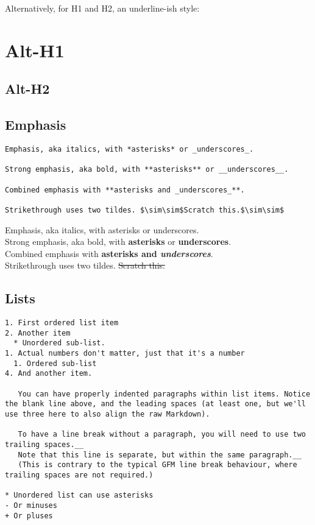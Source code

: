 \documentclass[a4paper, 11pt]{gfm}
\begin{document}
Alternatively, for H1 and H2, an underline-ish style:

\section{Alt-H1}

\subsection{Alt-H2}


\subsection{Emphasis}

\begin{lstlisting}
Emphasis, aka italics, with *asterisks* or _underscores_.

Strong emphasis, aka bold, with **asterisks** or __underscores__.

Combined emphasis with **asterisks and _underscores_**.

Strikethrough uses two tildes. $\sim\sim$Scratch this.$\sim\sim$
\end{lstlisting}

Emphasis, aka italics, with asterisks or underscores. \\

Strong emphasis, aka bold, with \textbf{asterisks} or \textbf{underscores}. \\

Combined emphasis with \textbf{asterisks and \textit{underscores}}. \\

Strikethrough uses two tildes. \sout{Scratch this.}


\subsection{Lists}

\begin{lstlisting}
1. First ordered list item
2. Another item
  * Unordered sub-list.
1. Actual numbers don't matter, just that it's a number
  1. Ordered sub-list
4. And another item.

   You can have properly indented paragraphs within list items. Notice the blank line above, and the leading spaces (at least one, but we'll use three here to also align the raw Markdown).

   To have a line break without a paragraph, you will need to use two trailing spaces.__
   Note that this line is separate, but within the same paragraph.__
   (This is contrary to the typical GFM line break behaviour, where trailing spaces are not required.)

* Unordered list can use asterisks
- Or minuses
+ Or pluses
\end{lstlisting}
\end{document}
